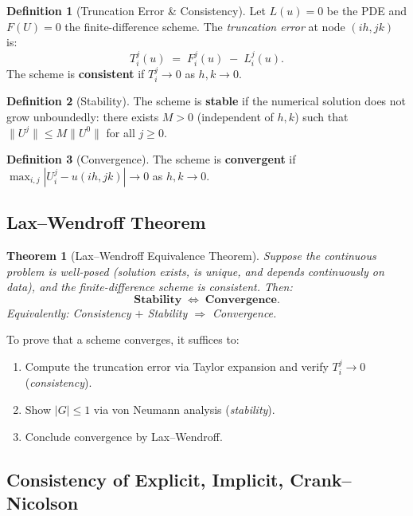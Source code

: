 \documentclass[12pt,a4paper]{article}
\theoremstyle{plain}
\newtheorem{theorem}{Theorem}[section]
\theoremstyle{definition}
\newtheorem{definition}{Definition}[section]
\theoremstyle{remark}
\begin{document}
\begin{definition}[Truncation Error \& Consistency]\label{def:consistency}
Let $L(u)=0$ be the PDE and $F(U)=0$ the finite-difference scheme.
The \emph{truncation error} at node $(ih,jk)$ is:
\[
  T_{i}^{j}(u)\;=\;F_{i}^{j}(u)\;-\;L_{i}^{j}(u).
\]
The scheme is \textbf{consistent} if $T_{i}^{j}\to0$ as $h,k\to0$.
\end{definition}

\begin{definition}[Stability]\label{def:stability}
The scheme is \textbf{stable} if the numerical solution does not grow
unboundedly: there exists $M>0$ (independent of $h,k$) such that
$\|U^{j}\|\leq M\|U^{0}\|$ for all $j\geq0$.
\end{definition}

\begin{definition}[Convergence]\label{def:convergence}
The scheme is \textbf{convergent} if
$\max_{i,j}|U_{i}^{j}-u(ih,jk)|\to0$ as $h,k\to0$.
\end{definition}

\subsection{Lax--Wendroff Theorem}

\begin{theorem}[Lax--Wendroff Equivalence Theorem]
Suppose the continuous problem is \emph{well-posed} (solution exists,
is unique, and depends continuously on data), and the finite-difference
scheme is \emph{consistent}.  Then:
\[
  \textbf{Stability}\;\iff\;\textbf{Convergence}.
\]
Equivalently: \quad Consistency $+$ Stability $\Rightarrow$ Convergence.
\end{theorem}

\begin{keybox}
To prove that a scheme converges, it suffices to:
\begin{enumerate}[label=\textbf{Step \arabic*:}]
  \item Compute the truncation error via Taylor expansion and
        verify $T_{i}^{j}\to0$ (\emph{consistency}).
  \item Show $|G|\leq1$ via von Neumann analysis (\emph{stability}).
  \item Conclude convergence by Lax--Wendroff.
\end{enumerate}
\end{keybox}

\subsection{Consistency of Explicit, Implicit, Crank--Nicolson}
\end{document}
